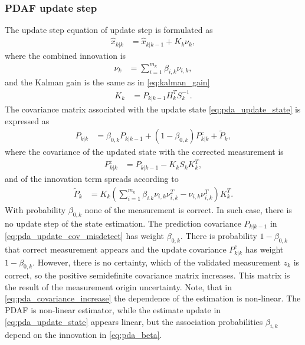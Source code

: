 \subsubsection{PDAF update step}
The update step equation of update step is formulated as
\begin{align}
    \hat{x}_{k|k} &= \hat{x}_{k|k-1} + K_k \nu_k, \label{eq:pda_update_state}
\end{align}
where the combined innovation is
\begin{align}
    \nu_k &= \sum_{i=1}^{m_k} \beta_{i,k} \nu_{i,k},
\end{align}
and the Kalman gain is the same as in \eqref{eq:kalman_gain}
\begin{align}
    K_k &= P_{k|k-1} H_k^T S_k^{-1}.
\end{align}
The covariance matrix associated with the update state \eqref{eq:pda_update_state} is expressed as
\begin{align}
    P_{k|k} &= \beta_{0,k} P_{k|k-1} + (1-\beta_{0,k}) P_{k|k}^c + \tilde{P}_k, \label{eq:pda_update_cov_misdetect}
\end{align}
where the covariance of the updated state with the corrected measurement is
\begin{align}
    P_{k|k}^c &= P_{k|k-1} - K_k S_k K_{k}^T, \label{eq:pda_update_cov_detenct}
\end{align}
and of the innovation term spreads according to
\begin{align}
    \tilde{P}_k &= K_k (\sum_{i=1}^{m_k} \beta_{i.k} \nu_{i,k} \nu_{i,k}^T - \nu_{i,k} \nu_{i,k}^T) K_k^T. \label{eq:pda_covariance_increase}
\end{align}
With probability $\beta_{0,k}$ none of the measurement is correct. In such case, there is no update step of the
state estimation. The prediction covariance $P_{k|k-1}$ in \eqref{eq:pda_update_cov_misdetect} has weight $\beta_{0,k}$. There
is probability $1-\beta_{0,k}$ that correct measurement appears and the update covariance $P_{k|k}^c$ has weight $1-\beta_{0,k}$. However, there is no certainty, which of the validated measurement $z_k$ is correct, so the positive semidefinite covariance matrix increases. This matrix is the result of the measurement origin uncertainty. Note, that in \eqref{eq:pda_covariance_increase} the dependence of the estimation is non-linear. The PDAF is non-linear estimator, while the estimate update in \eqref{eq:pda_update_state} appears linear, but the association probabilities $\beta_{i,k}$ depend on the innovation in \eqref{eq:pda_beta}.



